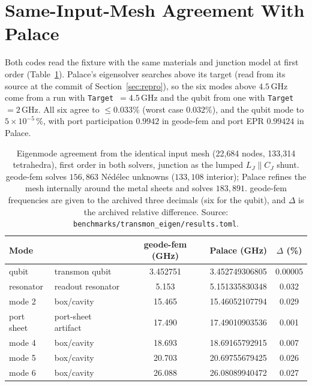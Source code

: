 \documentclass{anvil-paper}
\begin{document}
\section{Same-Input-Mesh Agreement With Palace}
\label{sec:agreement}

Both codes read the fixture with the same materials and junction model at
first order (Table~\ref{tab:agreement}). Palace's eigensolver searches above
its target (read from its source at the commit of
Section~\ref{sec:repro}), so the six modes above $4.5$\,GHz come from a run
with \texttt{Target}~$=4.5$\,GHz and the qubit from one with
\texttt{Target}~$=2$\,GHz. All six agree to $\leq 0.033\%$ (worst case
$0.032\%$), and the qubit mode to $5\times10^{-5}\,\%$, with port
participation $0.9942$ in geode-fem and port EPR $0.99424$ in Palace.

\begin{table}[htbp]
  \centering
  \caption{Eigenmode agreement from the identical input mesh (22{,}684
  nodes, 133{,}314 tetrahedra), first order in both solvers, junction as
  the lumped $L_J \parallel C_J$ shunt. geode-fem solves $156{,}863$
  N\'ed\'elec unknowns ($133{,}108$ interior); Palace refines the mesh
  internally around the metal sheets and solves $183{,}891$. geode-fem
  frequencies are given to the archived three decimals (six for the qubit),
  and $\Delta$ is the archived relative difference. Source:
  \texttt{benchmarks/transmon\_eigen/results.toml}.}
  \label{tab:agreement}
  \footnotesize
  \begin{tabular}{@{}llccc@{}}
    \toprule
    Mode & & geode-fem (GHz) & Palace (GHz) & $\Delta$ (\%) \\
    \midrule
    qubit & transmon qubit & 3.452751 & 3.452749306805 & 0.00005 \\
    resonator & readout resonator & 5.153 & 5.151335830348 & 0.032 \\
    mode 2 & box/cavity & 15.465 & 15.46052107794 & 0.029 \\
    port sheet & port-sheet artifact & 17.490 & 17.49010903536 & 0.001 \\
    mode 4 & box/cavity & 18.693 & 18.69165792915 & 0.007 \\
    mode 5 & box/cavity & 20.703 & 20.69755679425 & 0.026 \\
    mode 6 & box/cavity & 26.088 & 26.08089940472 & 0.027 \\
    \bottomrule
  \end{tabular}
\end{table}
\end{document}
